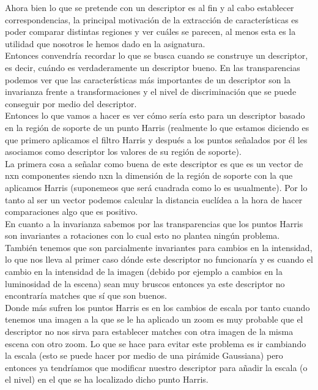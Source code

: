 \documentclass[10pt,a4paper]{article}
\begin{document}
Ahora bien lo que se pretende con un descriptor es al fin y al cabo establecer correspondencias, la principal motivación de la extracción de características es poder comparar distintas regiones y ver cuáles se parecen, al menos esta es la utilidad que nosotros le hemos dado en la asignatura.\\

Entonces convendría recordar lo que se busca cuando se construye un descriptor, es decir, cuándo es verdaderamente un descriptor bueno. En las transparencias podemos ver que las características más importantes de un descriptor son la invarianza frente a transformaciones y el nivel de discriminación que se puede conseguir por medio del descriptor.\\

Entonces lo que vamos a hacer es ver cómo sería esto para un descriptor basado en la región de soporte de un punto Harris (realmente lo que estamos diciendo es que primero aplicamos el filtro Harris y después a los puntos señalados por él les asociamos como descriptor los valores de su región de soporte).\\

La primera cosa a señalar como buena de este descriptor es que es un vector de nxn componentes siendo nxn la dimensión de la región de soporte con la que aplicamos Harris (suponemeos que será cuadrada como lo es usualmente). Por lo tanto al ser un vector podemos calcular la distancia euclídea a la hora de hacer comparaciones algo que es positivo.\\

En cuanto a la invarianza sabemos por las transparencias que los puntos Harris son invariantes a rotaciones con lo cual esto no plantea ningún problema. También tenemos que son parcialmente invariantes para cambios en la intensidad, lo que nos lleva al primer caso dónde este descriptor no funcionaría y es cuando el cambio en la intensidad de la imagen (debido por ejemplo a cambios en la luminosidad de la escena) sean muy bruscos entonces ya este descriptor no encontraría matches que sí que son buenos.\\

Donde más sufren los puntos Harris es en los cambios de escala por tanto cuando tenemos una imagen a la que se le ha aplicado un zoom es muy probable que el descriptor no nos sirva para establecer matches con otra imagen de la misma escena con otro zoom. Lo que se hace para evitar este problema es ir cambiando la escala (esto se puede hacer por medio de una pirámide Gaussiana) pero entonces ya tendríamos que modificar nuestro descriptor para añadir la escala (o el nivel) en el que se ha localizado dicho punto Harris.\\
\end{document}
